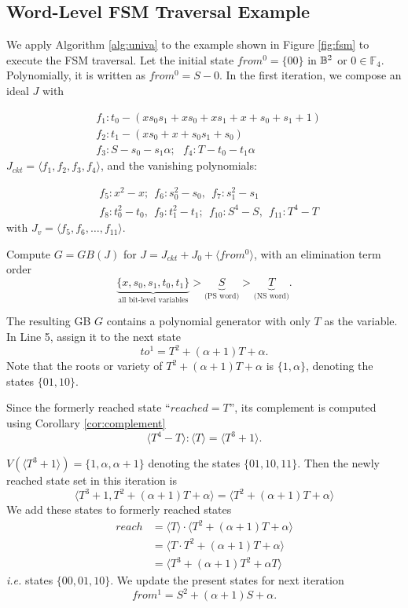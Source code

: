 \subsection{Word-Level FSM Traversal Example}
\begin{Example}
\label{ex:SMPO}
We apply Algorithm \ref{alg:univa} to the example shown in
Figure \ref{fig:fsm} to execute the FSM traversal. Let the initial state
$from^0 = \{00\}$ in ${\mathbb{B}}^2$ or $0 \in \mathbb F_4$. Polynomially, it is
written as $from^0 = S - 0$. In the first iteration, we compose
an ideal $J$ with 

\begin{align*}
&f_1: t_0- (xs_0s_1+xs_0+xs_1+x+s_0+s_1+1)\\
&f_2: t_1 - (xs_0+x+s_0s_1+s_0)\\
&f_3: S - s_0 - s_1\alpha; ~~~f_4: T - t_0 - t_1\alpha
\end{align*}
$J_{ckt} = \langle f_1,f_2,f_3,f_4\rangle$, and the vanishing
polynomials: 

\begin{align*}
&f_5: x^2-x; ~~f_6: s_0^2-s_0, ~~f_7: s_1^2-s_1\\
&f_8: t_0^2-t_0, ~~f_9: t_1^2-t_1; ~~f_{10}: S^4-S, ~~f_{11}:T^4-T
\end{align*}
with $J_v = \langle f_5,f_6,\dots,f_{11}\rangle$.


Compute $G = GB(J)$ for $J = J_{ckt}+J_0+\langle from^0\rangle$,
with an elimination term order 
$$ \underbrace{\{x,s_0,s_1,t_0,t_1\}}_{\text{all bit-level variables}} 
> \underbrace{S}_{\text{(PS~word)}} > \underbrace{T}_{\text{(NS~word)}}.$$

The resulting GB $G$ contains a polynomial generator with only $T$ as
the variable. In Line 5, assign it to the next state $$to^1 =
T^2+(\alpha+1)T+\alpha.$$ Note that the roots or variety of
$T^2+(\alpha+1)T+\alpha$ is $\{1, \alpha\}$, denoting the states
$\{01,10\}$. 

Since the formerly reached state ``$reached = T$'', its complement is
computed using Corollary \ref{cor:complement} 
$$\langle T^4-T\rangle:\langle T\rangle
= \langle T^3+1\rangle.$$ 

$V(\langle T^3 + 1\rangle) = \{1, \alpha, \alpha+1\}$ denoting the states
$\{01,10,11\}$. Then the newly reached state set in this iteration is 
$$\langle T^3+1, T^2+(\alpha+1)T+\alpha \rangle = \langle
T^2+(\alpha+1)T+\alpha \rangle$$ We add these states 
to formerly reached states 
\begin{align*}
reach &= \langle T\rangle \cdot \langle T^2+(\alpha+1)T+\alpha \rangle \\
&= \langle T\cdot T^2+(\alpha+1)T+\alpha \rangle \\
&= \langle T^3+(\alpha+1)T^2+\alpha T\rangle
\end{align*}
 {\it i.e.} states $\{00,01,10\}$. We update the present states
for next iteration $$from^1 = S^2+(\alpha+1)S+\alpha.$$ 


\end{Example}
